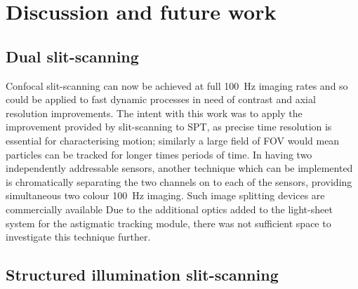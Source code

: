 %
\section{Discussion and future work}

\subsection{Dual \gls{slit-scanning}}

Confocal \gls{slit-scanning} can now be achieved at full \SI{100}{\hertz} imaging rates and so could be applied to fast dynamic processes in need of contrast and axial resolution improvements.
The intent with this work was to apply the improvement provided by \gls{slit-scanning} to \gls{SPT}, as precise time resolution is essential for characterising motion; similarly a large field of \gls{FOV} would mean particles can be tracked for longer times periods of time.
In having two independently addressable sensors, another technique which can be implemented is chromatically separating the two channels on to each of the sensors, providing simultaneous two colour \SI{100}{\hertz} imaging.
Such image splitting devices are commercially available\cite{EmissionImageSplitter}%
Due to the additional optics added to the light-sheet system for the astigmatic tracking module, there was not sufficient space to investigate this technique further.

\subsection{Structured illumination \gls{slit-scanning}}

